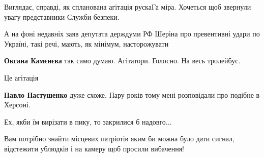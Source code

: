 \begin{itemize}
Виглядає, справді, як спланована агітація рускаГа міра. Хочеться щоб звернули
увагу представники Служби безпеки.

А на фоні недавніх заяв депутата держдуми РФ Шеріна про превентивні удари по
Україні, такі речі, мають, як мінімум, насторожувати

\begin{itemize}
 
\textbf{Оксана Камєнєва} так само думаю. Агітатори. Голосно. На весь тролейбус.
\end{itemize}

 
Це агітація

\begin{itemize}
 
\textbf{Павло Пастушенко} дуже схоже. Пару років тому мені розповідали про подібне в Херсоні.
\end{itemize}

 
Ех, якби їм вирізати в пику, то закрилися б надовго...

 
Вам потрібно знайти місцевих патріотів яким би можна було дати сигнал, відстежити ублюдків і на камеру щоб просили вибачення!


\end{itemize}
